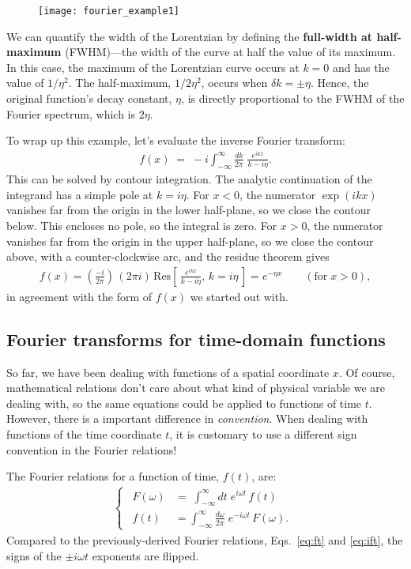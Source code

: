 \documentclass[10pt,a4paper]{article}
\begin{document}
\begin{figure}[h]
  \centering\texttt{[image: fourier\_example1]}
\end{figure}

We can quantify the width of the Lorentzian by defining the
\textbf{full-width at half-maximum} (FWHM)---the width of the curve at
half the value of its maximum.  In this case, the maximum of the
Lorentzian curve occurs at $k=0$ and has the value of $1/\eta^2$.  The
half-maximum, $1/2\eta^2$, occurs when $\delta k = \pm \eta$.  Hence,
the original function's decay constant, $\eta$, is directly
proportional to the FWHM of the Fourier spectrum, which is $2\eta$.

To wrap up this example, let's evaluate the inverse Fourier transform:
\begin{align}
  f(x) \; = \; -i\int_{-\infty}^\infty \frac{dk}{2\pi} \; \frac{e^{i kx}}{k-i\eta}.
\end{align}
This can be solved by contour integration.  The analytic continuation
of the integrand has a simple pole at $k = i\eta$.  For $x < 0$, the
numerator $\exp(ikx)$ vanishes far from the origin in the lower
half-plane, so we close the contour below.  This encloses no pole, so
the integral is zero.  For $x > 0$, the numerator vanishes far from
the origin in the upper half-plane, so we close the contour above,
with a counter-clockwise arc, and the residue theorem gives
\begin{align}
  f(x) = \left(\frac{-i}{2\pi}\right) \, \left(2\pi i\right) \, \mathrm{Res}\left[\, \frac{e^{ikx}}{k-i\eta}, \, k=i\eta\, \right] = e^{-\eta x} \qquad(\mathrm{for}\; x > 0),
\end{align}
in agreement with the form of $f(x)$ we started out with.

\subsection{Fourier transforms for time-domain functions}
\label{fourier-time}

So far, we have been dealing with functions of a spatial coordinate
$x$.  Of course, mathematical relations don't care about what kind of
physical variable we are dealing with, so the same equations could be
applied to functions of time $t$. However, there is a important
difference in \textit{convention}.  When dealing with functions of the
time coordinate $t$, it is customary to use a different sign
convention in the Fourier relations!

The Fourier relations for a function of time, $f(t)$, are:
\begin{align}
  \left\{\;\,\begin{aligned}F(\omega) &= \;\int_{-\infty}^\infty dt\; e^{i\omega t}\, f(t) \\ f(t) &= \int_{-\infty}^\infty \frac{d\omega}{2\pi}\; e^{-i\omega t}\, F(\omega).\end{aligned}\;\,\right.
\end{align}
Compared to the previously-derived Fourier relations,
Eqs.~\eqref{eq:ft} and \eqref{eq:ift}, the signs of the $\pm i \omega
t$ exponents are flipped.
\end{document}
